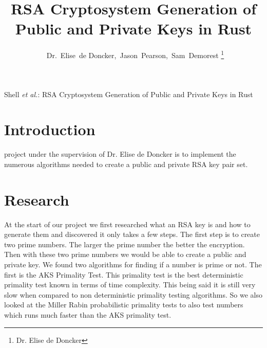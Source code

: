 \documentclass[12pt,journal,compsoc]{IEEEtran}
\begin{document}
%
\title{RSA Cryptosystem Generation of Public and Private Keys in Rust}
\author{~Dr.~Elise~de Doncker,~Jason~Pearson,~Sam~Demorest%
\thanks{Dr. Elise de Doncker}}

\markboth{}%
{Shell \MakeLowercase{\textit{et al.}}: RSA Cryptosystem Generation of Public and Private Keys in Rust}





\maketitle

\IEEEdisplaynotcompsoctitleabstractindextext
\IEEEpeerreviewmaketitle



\section{Introduction}
 project under the supervision of Dr. Elise de Doncker is to implement the numerous algorithms needed to create a public and private RSA key pair set. 


\section{Research}
At the start of our project we first researched what an RSA key is and how to generate them and discovered it only takes a few steps. The first step is to create two prime numbers. The larger the prime number the better the encryption. Then with these two prime numbers we would be able to create a public and private key. 
\newline \indent We found two algorithms for finding if a number is prime or not. The first is the AKS Primality Test. This primality test is the best deterministic primality test known in terms of time complexity. This being said it is still very slow when compared to non deterministic primality testing algorithms. So we also looked at the Miller Rabin probabilistic primality tests to also test numbers which runs much faster than the AKS primality test.
\end{document}
